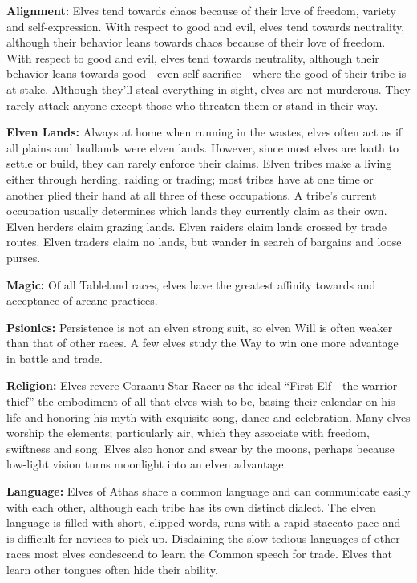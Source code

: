 \textbf{Alignment:} Elves tend towards chaos because of their love of freedom, variety and self-expression. With respect to good and evil, elves tend towards neutrality, although their behavior leans towards chaos because of their love of freedom. With respect to good and evil, elves tend towards neutrality, although their behavior leans towards good - even self-sacrifice---where the good of their tribe is at stake. Although they'll steal everything in sight, elves are not murderous. They rarely attack anyone except those who threaten them or stand in their way.

\textbf{Elven Lands:} Always at home when running in the wastes, elves often act as if all plains and badlands were elven lands. However, since most elves are loath to settle or build, they can rarely enforce their claims. Elven tribes make a living either through herding, raiding or trading; most tribes have at one time or another plied their hand at all three of these occupations. A tribe's current occupation usually determines which lands they currently claim as their own. Elven herders claim grazing lands. Elven raiders claim lands crossed by trade routes. Elven traders claim no lands, but wander in search of bargains and loose purses.

\textbf{Magic:} Of all Tableland races, elves have the greatest affinity towards and acceptance of arcane practices.

\textbf{Psionics:} Persistence is not an elven strong suit, so elven Will is often weaker than that of other races. A few elves study the Way to win one more advantage in battle and trade.

\textbf{Religion:} Elves revere Coraanu Star Racer as the ideal ``First Elf - the warrior thief'' the embodiment of all that elves wish to be, basing their calendar on his life and honoring his myth with exquisite song, dance and celebration. Many elves worship the elements; particularly air, which they associate with freedom, swiftness and song. Elves also honor and swear by the moons, perhaps because low-light vision turns moonlight into an elven advantage.

\textbf{Language:} Elves of Athas share a common language and can communicate easily with each other, although each tribe has its own distinct dialect. The elven language is filled with short, clipped words, runs with a rapid staccato pace and is difficult for novices to pick up. Disdaining the slow tedious languages of other races most elves condescend to learn the Common speech for trade. Elves that learn other tongues often hide their ability.

